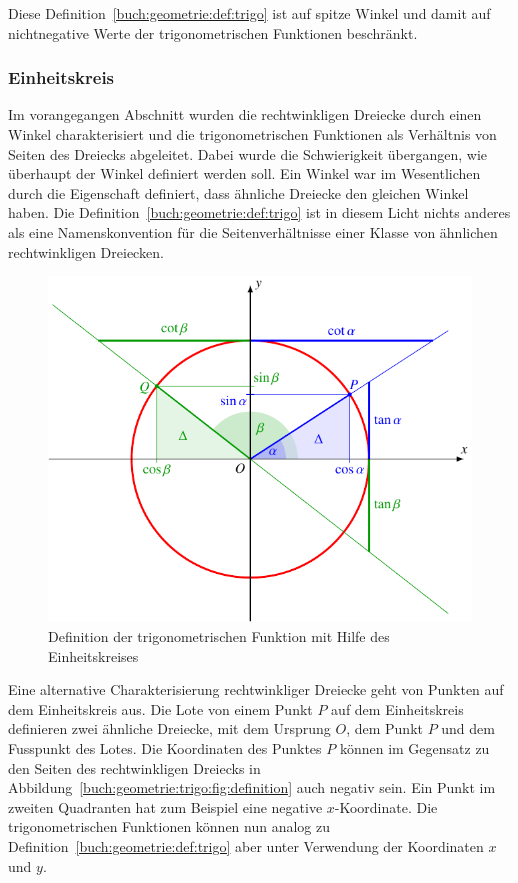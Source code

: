 Diese Definition~\ref{buch:geometrie:def:trigo}
ist auf spitze Winkel und damit auf nichtnegative Werte der
trigonometrischen Funktionen beschränkt.

%
%
\subsubsection{Einheitskreis}
Im vorangegangen Abschnitt wurden die rechtwinkligen Dreiecke durch
einen Winkel charakterisiert und die trigonometrischen
Funktionen als Verhältnis von Seiten des Dreiecks abgeleitet.
Dabei wurde die Schwierigkeit übergangen, wie überhaupt der Winkel
definiert werden soll.
Ein Winkel war im Wesentlichen durch die Eigenschaft
definiert, dass ähnliche Dreiecke den gleichen Winkel haben.
Die Definition~\ref{buch:geometrie:def:trigo} ist in diesem Licht
nichts anderes als eine Namenskonvention für die Seitenverhältnisse
einer Klasse von ähnlichen rechtwinkligen Dreiecken.

\begin{figure}
\centering
\includegraphics{chapters/030-geometrie/images/einheitskreis.pdf}
\caption{Definition der trigonometrischen Funktion mit Hilfe des
Einheitskreises
\label{buch:geometrie:trigo:fig:einheitskreis}}
\end{figure}

Eine alternative Charakterisierung rechtwinkliger Dreiecke
geht von Punkten auf dem Einheitskreis aus.
Die Lote von einem Punkt $P$ auf dem Einheitskreis definieren
zwei ähnliche Dreiecke, mit dem Ursprung $O$, dem Punkt $P$
und dem Fusspunkt des Lotes.
Die Koordinaten des Punktes $P$ können im Gegensatz zu den Seiten
des rechtwinkligen Dreiecks in
Abbildung~\ref{buch:geometrie:trigo:fig:definition}
auch negativ sein.
Ein Punkt im zweiten Quadranten hat zum Beispiel eine negative
$x$-Koordinate.
Die trigonometrischen Funktionen können nun analog zu
Definition~\ref{buch:geometrie:def:trigo} aber unter Verwendung
der Koordinaten $x$ und $y$.

